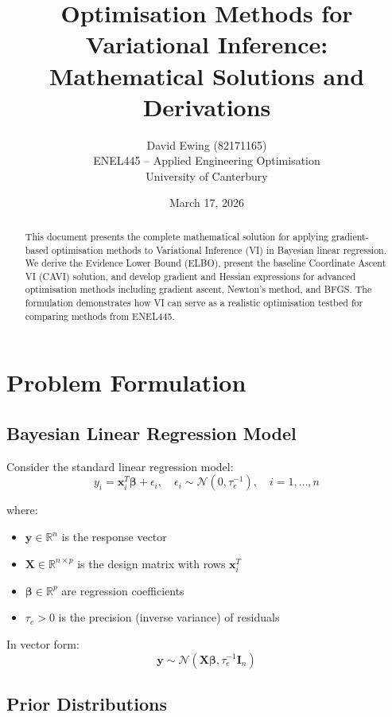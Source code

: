 \documentclass[11pt]{article}
\title{Optimisation Methods for Variational Inference:\\
Mathematical Solutions and Derivations}
\author{David Ewing (82171165)\\
ENEL445 -- Applied Engineering Optimisation\\
University of Canterbury}
\date{March 17, 2026}
\newcommand{\R}{\mathbb{R}}
\newcommand{\N}{\mathcal{N}}
\begin{document}
\maketitle

\begin{abstract}
This document presents the complete mathematical solution for applying gradient-based optimisation methods to Variational Inference (VI) in Bayesian linear regression. We derive the Evidence Lower Bound (ELBO), present the baseline Coordinate Ascent VI (CAVI) solution, and develop gradient and Hessian expressions for advanced optimisation methods including gradient ascent, Newton's method, and BFGS. The formulation demonstrates how VI can serve as a realistic optimisation testbed for comparing methods from ENEL445.
\end{abstract}

\tableofcontents
\newpage

\section{Problem Formulation}

\subsection{Bayesian Linear Regression Model}

Consider the standard linear regression model:
\begin{equation}
y_i = \bm{x}_i^T \bm{\beta} + \epsilon_i, \quad \epsilon_i \sim \N(0, \tau_e^{-1}), \quad i = 1,\ldots,n
\end{equation}

where:
\begin{itemize}
\item $\bm{y} \in \R^n$ is the response vector
\item $\bm{X} \in \R^{n \times p}$ is the design matrix with rows $\bm{x}_i^T$
\item $\bm{\beta} \in \R^p$ are regression coefficients
\item $\tau_e > 0$ is the precision (inverse variance) of residuals
\end{itemize}

In vector form:
\begin{equation}
\bm{y} \sim \N(\bm{X}\bm{\beta}, \tau_e^{-1} \bm{I}_n)
\end{equation}

\subsection{Prior Distributions}
\end{document}
